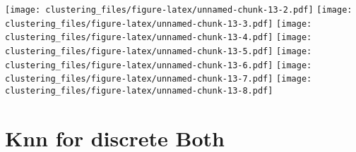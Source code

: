 \documentclass[]{article}
\newenvironment{Shaded}{\begin{snugshade}}{\end{snugshade}}
\newcommand{\DataTypeTok}[1]{\textcolor[rgb]{0.13,0.29,0.53}{#1}}
\newcommand{\DecValTok}[1]{\textcolor[rgb]{0.00,0.00,0.81}{#1}}
\newcommand{\KeywordTok}[1]{\textcolor[rgb]{0.13,0.29,0.53}{\textbf{#1}}}
\newcommand{\NormalTok}[1]{#1}
\newcommand{\OperatorTok}[1]{\textcolor[rgb]{0.81,0.36,0.00}{\textbf{#1}}}
\newcommand{\OtherTok}[1]{\textcolor[rgb]{0.56,0.35,0.01}{#1}}
\newcommand{\StringTok}[1]{\textcolor[rgb]{0.31,0.60,0.02}{#1}}
\begin{document}
\texttt{[image: clustering\_files/figure-latex/unnamed-chunk-13-2.pdf]}
\texttt{[image: clustering\_files/figure-latex/unnamed-chunk-13-3.pdf]}
\texttt{[image: clustering\_files/figure-latex/unnamed-chunk-13-4.pdf]}
\texttt{[image: clustering\_files/figure-latex/unnamed-chunk-13-5.pdf]}
\texttt{[image: clustering\_files/figure-latex/unnamed-chunk-13-6.pdf]}
\texttt{[image: clustering\_files/figure-latex/unnamed-chunk-13-7.pdf]}
\texttt{[image: clustering\_files/figure-latex/unnamed-chunk-13-8.pdf]}

\hypertarget{knn-for-discrete-both}{%
\section{Knn for discrete Both}\label{knn-for-discrete-both}}

\begin{Shaded}
\end{Shaded}
\end{document}
